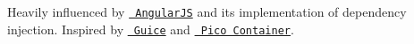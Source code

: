 Heavily influenced by \href{http://angularjs.org/}{\texttt{ Angular\+JS}} and its implementation of dependency injection. Inspired by \href{http://code.google.com/p/google-guice/}{\texttt{ Guice}} and \href{http://picocontainer.codehaus.org/}{\texttt{ Pico Container}}. 